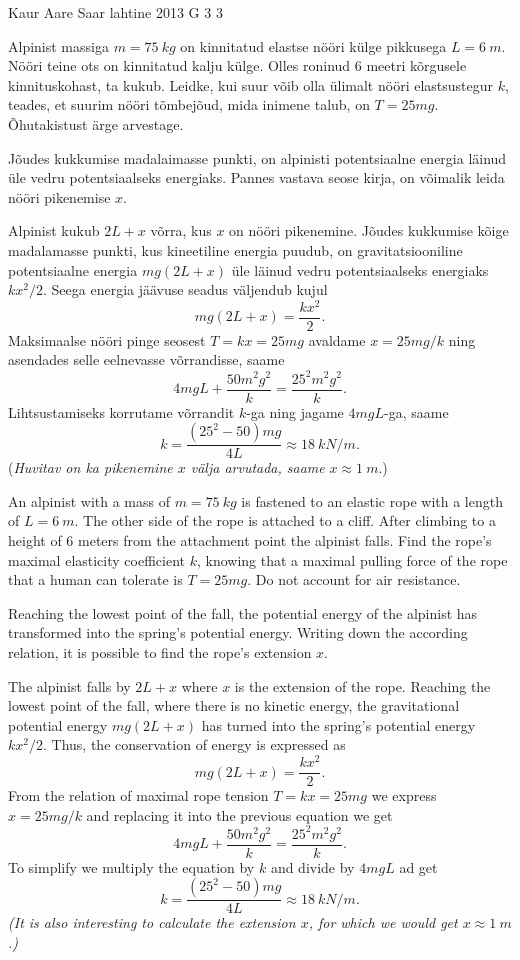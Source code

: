 {Kaur Aare Saar} %
{lahtine} %
{2013} %
{G 3} %
{3} %
{
\ifStatement
Alpinist massiga $m=\SI{75}{kg}$ on kinnitatud elastse nööri külge pikkusega
$L=\SI{6}{m}$. Nööri teine ots on kinnitatud kalju külge. Olles roninud 6 meetri
kõrgusele kinnituskohast, ta kukub. Leidke, kui suur võib olla ülimalt nööri
elastsustegur $k$, teades, et suurim nööri tõmbejõud, mida inimene talub, on
$T=25mg$.  Õhutakistust ärge arvestage.
\fi


\ifHint
Jõudes kukkumise madalaimasse punkti, on alpinisti potentsiaalne energia läinud üle vedru potentsiaalseks energiaks. Pannes vastava seose kirja, on võimalik leida nööri pikenemise $x$.
\fi


\ifSolution
Alpinist kukub $2L+x$ võrra, kus $x$ on nööri pikenemine. Jõudes kukkumise kõige madalamasse punkti, kus kineetiline energia puudub, on gravitatsiooniline potentsiaalne energia $mg(2L+x)$ üle läinud vedru potentsiaalseks energiaks $kx^2/2$. Seega energia jäävuse seadus väljendub kujul
\[mg(2L+x)=\frac{kx^2}{2}.\]
Maksimaalse nööri pinge seosest $T=kx=25mg$ avaldame $x=25mg/k$ ning asendades selle eelnevasse võrrandisse, saame
\[4mgL+\frac{50m^2g^2}{k}=\frac{25^2m^2g^2}{k}.\]
Lihtsustamiseks korrutame võrrandit $k$-ga ning jagame $4mgL$-ga, saame
\[k=\frac{(25^2-50)mg}{4L}\approx \SI{18}{kN/m}.\]
({\em Huvitav on ka pikenemine $x$ välja arvutada, saame} $x\approx \SI{1}{m}$.)
\fi


\ifEngStatement
An alpinist with a mass of $m=\SI{75}{kg}$ is fastened to an elastic rope with a length of $L=\SI{6}{m}$. The other side of the rope is attached to a cliff. After climbing to a height of 6 meters from the attachment point the alpinist falls. Find the rope’s maximal elasticity coefficient $k$, knowing that a maximal pulling force of the rope that a human can tolerate is $T=25mg$. Do not account for air resistance.
\fi


\ifEngHint
Reaching the lowest point of the fall, the potential energy of the alpinist has transformed into the spring’s potential energy. Writing down the according relation, it is possible to find the rope’s extension $x$.
\fi


\ifEngSolution
The alpinist falls by $2L+x$ where $x$ is the extension of the rope. Reaching the lowest point of the fall, where there is no kinetic energy, the gravitational potential energy $mg(2L+x)$ has turned into the spring’s potential energy $kx^2/2$. Thus, the conservation of energy is expressed as 
\[mg(2L+x)=\frac{kx^2}{2}.\]
From the relation of maximal rope tension $T=kx=25mg$ we express $x=25mg/k$ and replacing it into the previous equation we get
\[4mgL+\frac{50m^2g^2}{k}=\frac{25^2m^2g^2}{k}.\]
To simplify we multiply the equation by $k$ and divide by $4mgL$ ad get 
\[k=\frac{(25^2-50)mg}{4L}\approx \SI{18}{kN/m}.\] 
\emph{(It is also interesting to calculate the extension $x$, for which we would get $x\approx \SI{1}{m}$.)}
\fi
}